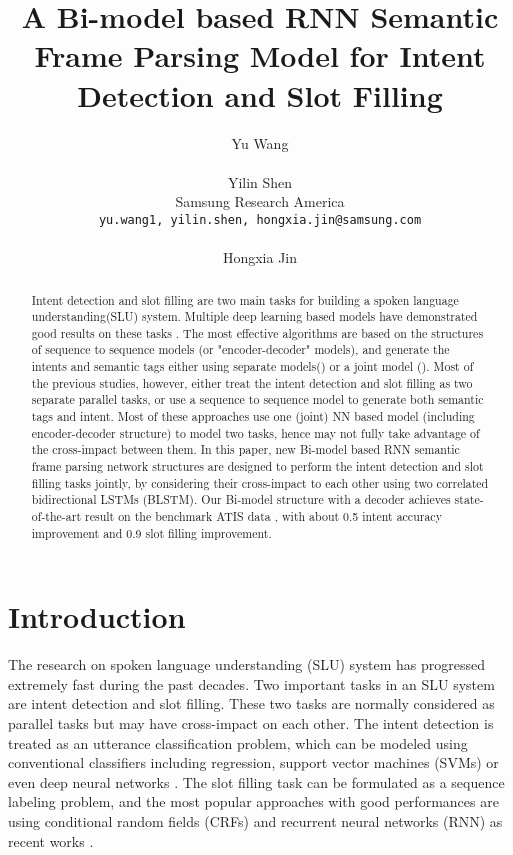 \documentclass[11pt,a4paper]{article}
\title{A Bi-model based RNN Semantic Frame Parsing Model for Intent Detection and Slot Filling}
\author{Yu Wang \\
  \\\And
  Yilin Shen \\
  Samsung Research America  \\
  {\tt yu.wang1, yilin.shen, hongxia.jin@samsung.com} \\
  \\\And
  Hongxia Jin \\
  }
\date{}
\begin{document}
\maketitle
\begin{abstract}
Intent detection and slot filling are two main tasks for building a spoken language understanding(SLU) system. Multiple deep learning based models have demonstrated good results on these tasks . The most effective algorithms are based on the structures of sequence to sequence models (or "encoder-decoder" models), and generate the intents and semantic tags either using separate models(\cite{yao2014spoken,mesnil2015using,peng2015recurrent,kurata2016leveraging,hahn2011comparing}) or a joint model (\cite{liu2016attention,hakkani2016multi, guo2014joint}). Most of the previous studies, however, either treat the intent detection and slot filling as two separate parallel tasks, or use a sequence to sequence model to generate both semantic tags and intent. Most of these approaches use one (joint) NN based model (including encoder-decoder structure) to model two tasks, hence may not fully take advantage of the cross-impact between them. In this paper, new Bi-model based RNN semantic frame parsing network structures are designed to perform the intent detection and slot filling tasks jointly, by considering their cross-impact to each other using two correlated bidirectional LSTMs (BLSTM). Our Bi-model structure with a decoder achieves state-of-the-art result on the benchmark ATIS data \cite{hemphill1990atis,tur2010left}, with about 0.5 intent accuracy improvement and 0.9  slot filling improvement.
\end{abstract}

\section{Introduction}
The research on spoken language understanding (SLU) system has progressed extremely fast during the past decades. Two important tasks in an SLU system are intent detection and slot filling. These two tasks are normally considered as parallel tasks but may have cross-impact on each other. The intent detection is treated as an utterance classification problem, which can be modeled using conventional classifiers including regression, support vector machines (SVMs) or even deep neural networks \cite{haffner2003optimizing, sarikaya2011deep}.
The slot filling task can be formulated as a sequence labeling problem, and the most popular approaches with good performances are using conditional random fields (CRFs) and recurrent neural networks (RNN) as recent works \cite{xu2013convolutional}. 
\end{document}
